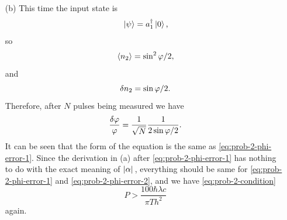 \documentclass[hyperref, a4paper]{article}
\begin{document}
\begin{itemize}
\item[(b)] This time the input state is 
\begin{equation}
    \ket*{\psi} = a_1^\dagger \ket*{0},
\end{equation} 
so 
\begin{equation}
    \expval*{n_2} = \sin^2 \varphi / 2,
\end{equation}
and 
\begin{equation}
    \var{n_2} = \sin \varphi / 2.
\end{equation}
Therefore, after $N$ pulses being measured we have 
\begin{equation}
    \frac{\var{\varphi}}{\varphi} = \frac{1}{\sqrt{N}} \frac{1}{2 \sin \varphi / 2}.
    \label{eq:prob-2-phi-error-2}
\end{equation}
It can be seen that the form of the equation is the same as \eqref{eq:prob-2-phi-error-1}. 
Since the derivation in (a) after \eqref{eq:prob-2-phi-error-1} has nothing to do with the exact meaning of $\abs*{\alpha}$,
everything should be same for \eqref{eq:prob-2-phi-error-1} and \eqref{eq:prob-2-phi-error-2}, and we have \eqref{eq:prob-2-condition}
\begin{equation}
    P > \frac{100 \hbar \lambda c}{\pi T h^2}
\end{equation}
again. 


\end{itemize}
\end{document}
